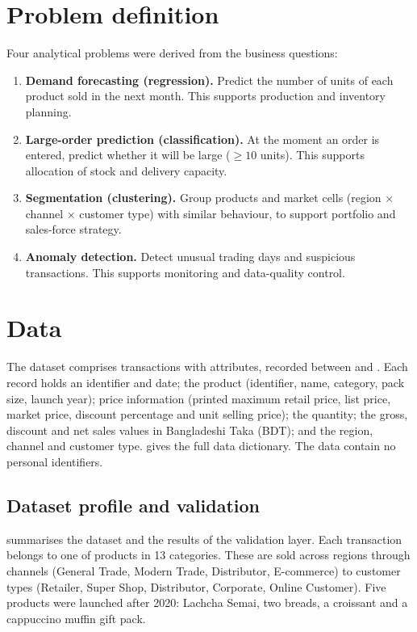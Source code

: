\section{Problem definition}
Four analytical problems were derived from the business questions:
\begin{enumerate}
  \item \textbf{Demand forecasting (regression).} Predict the number of units of each product sold in the
        next month. This supports production and inventory planning.
  \item \textbf{Large-order prediction (classification).} At the moment an order is entered, predict whether
        it will be large (\(\geq 10\) units). This supports allocation of stock and delivery capacity.
  \item \textbf{Segmentation (clustering).} Group products and market cells (region $\times$ channel $\times$
        customer type) with similar behaviour, to support portfolio and sales-force strategy.
  \item \textbf{Anomaly detection.} Detect unusual trading days and suspicious transactions. This supports
        monitoring and data-quality control.
\end{enumerate}

\section{Data}
The dataset comprises \NRows transactions with \NCols attributes, recorded between \DateMin and \DateMax. Each
record holds an identifier and date; the product (identifier, name, category, pack size, launch year); price
information (printed maximum retail price, list price, market price, discount percentage and unit selling
price); the quantity; the gross, discount and net sales values in Bangladeshi Taka (BDT); and the region,
channel and customer type.  gives the full data dictionary. The
data contain no personal identifiers.

\subsection{Dataset profile and validation}
 summarises the dataset and the results of the validation layer. Each transaction belongs to
one of \NProducts products in 13 categories. These are sold across \NRegions regions through \NChannels
channels (General Trade, Modern Trade, Distributor, E-commerce) to \NCustTypes customer types (Retailer, Super
Shop, Distributor, Corporate, Online Customer). Five products were launched after 2020: Lachcha Semai, two
breads, a croissant and a cappuccino muffin gift pack.


